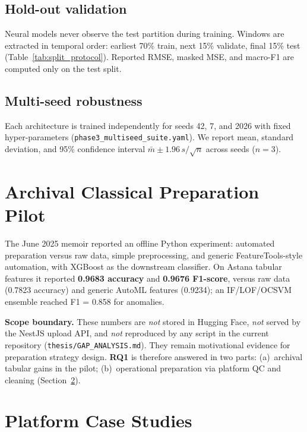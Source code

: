

\subsection{Hold-out validation}

Neural models never observe the test partition during training. Windows are extracted in temporal order: earliest 70\% train, next 15\% validate, final 15\% test (Table~\ref{tab:split_protocol}). Reported RMSE, masked MSE, and macro-F1 are computed only on the test split.

\subsection{Multi-seed robustness}

Each architecture is trained independently for seeds 42, 7, and 2026 with fixed hyper-parameters (\texttt{phase3\_multiseed\_suite.yaml}). We report mean, standard deviation, and 95\% confidence interval $\bar{m} \pm 1.96\, s/\sqrt{n}$ across seeds ($n=3$).

\section{Archival Classical Preparation Pilot}
\label{sec:classical_results}

The June 2025 memoir reported an offline Python experiment: automated preparation versus raw data, simple preprocessing, and generic FeatureTools-style automation, with XGBoost as the downstream classifier. On Astana tabular features it reported \textbf{0.9683 accuracy} and \textbf{0.9676 F1-score}, versus raw data (0.7823 accuracy) and generic AutoML features (0.9234); an IF/LOF/OCSVM ensemble reached F1 = 0.858 for anomalies.

\textbf{Scope boundary.} These numbers are \emph{not} stored in Hugging Face, \emph{not} served by the NestJS upload API, and \emph{not} reproduced by any script in the current repository (\texttt{thesis/GAP\_ANALYSIS.md}). They remain motivational evidence for preparation strategy design. \textbf{RQ1} is therefore answered in two parts: (a)~archival tabular gains in the pilot; (b)~operational preparation via platform QC and cleaning (Section~\ref{sec:platform_cases}).

\section{Platform Case Studies}
\label{sec:platform_cases}

